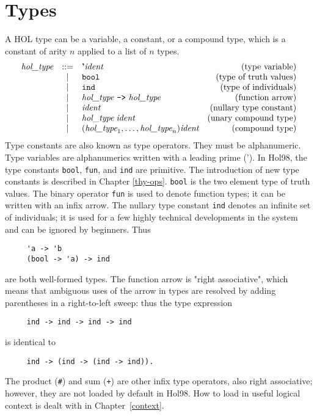  \section{Types}

 A HOL type can be a variable, a constant, or a compound type, which is a
 constant of arity $n$ applied to a list of $n$ types. 
 \[
 \begin{array}{rclr}
  \type & ::= & \mbox{\bf '}\ident & \mbox{(type variable)} \\
     & | &  \verb+bool+ & \mbox{(type of truth values)} \\
     & | &  \verb+ind+ & \mbox{(type of individuals)} \\
     & | &  \type\ \verb+->+\ \type & \mbox{(function arrow)} \\
     & | &  \ident & \mbox{(nullary type constant)} \\
     & | & \type\; \ident & \mbox{(unary compound type)} \\
     & | & (\type_1,\ldots,\type_n) \ident &
 \mbox{(compound type)}
 \end{array}
 \]
 Type constants are also known as type operators. They must be
 alphanumeric. Type variables are
 alphanumerics written with a leading prime ('). In Hol98, the type
 constants {\tt bool}, {\tt fun}, and {\tt ind} are primitive. The
 introduction of new type constants is described in Chapter
 \ref{thy-ops}. {\tt bool} is the two element type of truth values. The
 binary operator {\tt fun} is used to denote function types; it can be
 written with an infix arrow. The nullary type constant {\tt ind} denotes
 an infinite set of individuals; it is used for a few highly technical
 developments in the system and can be ignored by beginners.  Thus 
 \begin{verbatim}
     'a -> 'b
     (bool -> 'a) -> ind
 \end{verbatim}
 are both well-formed types. The function arrow is "right associative",
 which means that ambiguous uses of the arrow in types are resolved by
 adding parentheses in a right-to-left sweep: thus the type expression
 \begin{verbatim}
     ind -> ind -> ind -> ind
 \end{verbatim}
 is identical to 
 \begin{verbatim}
     ind -> (ind -> (ind -> ind)).
 \end{verbatim}
 The product (\verb+#+) and sum (\verb!+!) are other infix type
 operators, also right associative; however, they are not loaded by
 default in Hol98. How to load in useful logical context is
 dealt with in Chapter~\ref{context}. 

